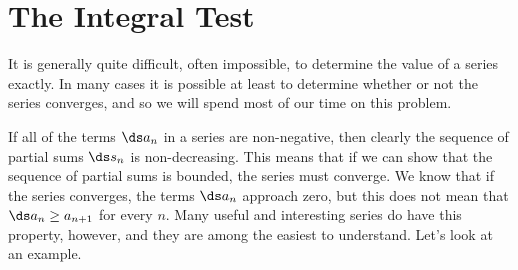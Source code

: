 \section{The Integral Test}{}{}
\nobreak
It is generally quite difficult, often impossible, to determine
the value of a series exactly. In many cases it is possible at least
to determine whether or not the series converges, and so we will spend
most of our time on this problem.

If all of the terms $\ds a_n$ in a series are non-negative, then clearly 
the sequence of partial sums $\ds s_n$ is non-decreasing. This means that
if we can show that the sequence of partial sums is bounded, the
series must converge. We know that if the series converges, the terms
$\ds a_n$ approach zero, but this does not mean that $\ds a_n\ge a_{n+1}$ for
every $n$. Many useful and interesting series do have this property,
however, and they are among the easiest to understand. Let's look at
an example.

